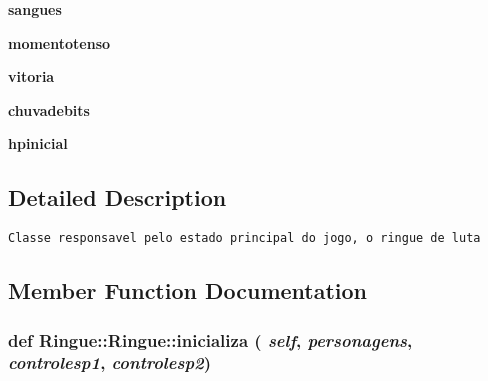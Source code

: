 \begin{CompactItemize}
\item 
\hypertarget{class_ringue_1_1_ringue_1c80472db3d8b2c4b718bd929cd84aca}{
\textbf{sangues}}
\label{class_ringue_1_1_ringue_1c80472db3d8b2c4b718bd929cd84aca}

\item 
\hypertarget{class_ringue_1_1_ringue_283235afe7c717fd764d53371251cb50}{
\textbf{momentotenso}}
\label{class_ringue_1_1_ringue_283235afe7c717fd764d53371251cb50}

\item 
\hypertarget{class_ringue_1_1_ringue_8dfdc973720d2d8168207026f943bf3c}{
\textbf{vitoria}}
\label{class_ringue_1_1_ringue_8dfdc973720d2d8168207026f943bf3c}

\item 
\hypertarget{class_ringue_1_1_ringue_37b66d707638cdeb2fb91e0d77c88918}{
\textbf{chuvadebits}}
\label{class_ringue_1_1_ringue_37b66d707638cdeb2fb91e0d77c88918}

\item 
\hypertarget{class_ringue_1_1_ringue_008bd25bea7ab01e16b21b47e321f6fd}{
\textbf{hpinicial}}
\label{class_ringue_1_1_ringue_008bd25bea7ab01e16b21b47e321f6fd}

\end{CompactItemize}


\subsection{Detailed Description}


\begin{footnotesize}\begin{verbatim}Classe responsavel pelo estado principal do jogo, o ringue de luta \end{verbatim}
\end{footnotesize}
 

\subsection{Member Function Documentation}
\hypertarget{class_ringue_1_1_ringue_73fd368a6647d9f4414cfaf8499d1c43}{
\subsubsection[{inicializa}]{\setlength{\rightskip}{0pt plus 5cm}def Ringue::Ringue::inicializa ( {\em self}, \/   {\em personagens}, \/   {\em controlesp1}, \/   {\em controlesp2})}}
\label{class_ringue_1_1_ringue_73fd368a6647d9f4414cfaf8499d1c43}




